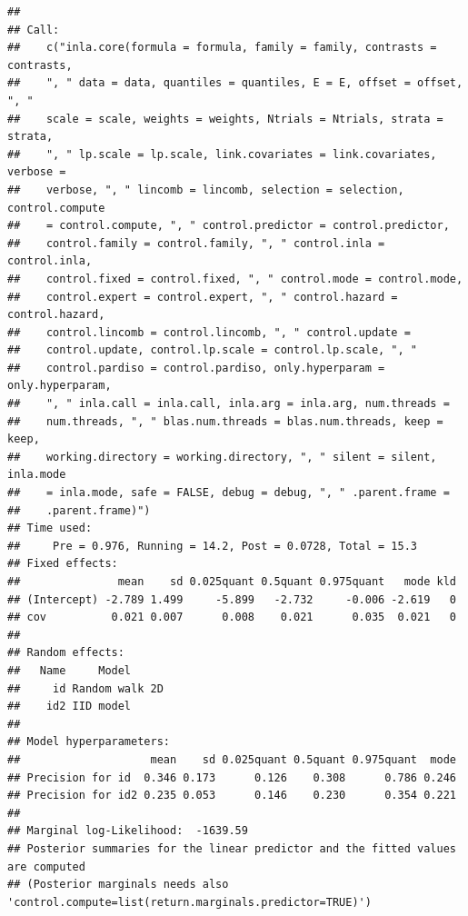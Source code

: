 \documentclass[
]{article}
\begin{document}
\begin{verbatim}
## 
## Call:
##    c("inla.core(formula = formula, family = family, contrasts = contrasts, 
##    ", " data = data, quantiles = quantiles, E = E, offset = offset, ", " 
##    scale = scale, weights = weights, Ntrials = Ntrials, strata = strata, 
##    ", " lp.scale = lp.scale, link.covariates = link.covariates, verbose = 
##    verbose, ", " lincomb = lincomb, selection = selection, control.compute 
##    = control.compute, ", " control.predictor = control.predictor, 
##    control.family = control.family, ", " control.inla = control.inla, 
##    control.fixed = control.fixed, ", " control.mode = control.mode, 
##    control.expert = control.expert, ", " control.hazard = control.hazard, 
##    control.lincomb = control.lincomb, ", " control.update = 
##    control.update, control.lp.scale = control.lp.scale, ", " 
##    control.pardiso = control.pardiso, only.hyperparam = only.hyperparam, 
##    ", " inla.call = inla.call, inla.arg = inla.arg, num.threads = 
##    num.threads, ", " blas.num.threads = blas.num.threads, keep = keep, 
##    working.directory = working.directory, ", " silent = silent, inla.mode 
##    = inla.mode, safe = FALSE, debug = debug, ", " .parent.frame = 
##    .parent.frame)") 
## Time used:
##     Pre = 0.976, Running = 14.2, Post = 0.0728, Total = 15.3 
## Fixed effects:
##               mean    sd 0.025quant 0.5quant 0.975quant   mode kld
## (Intercept) -2.789 1.499     -5.899   -2.732     -0.006 -2.619   0
## cov          0.021 0.007      0.008    0.021      0.035  0.021   0
## 
## Random effects:
##   Name     Model
##     id Random walk 2D
##    id2 IID model
## 
## Model hyperparameters:
##                    mean    sd 0.025quant 0.5quant 0.975quant  mode
## Precision for id  0.346 0.173      0.126    0.308      0.786 0.246
## Precision for id2 0.235 0.053      0.146    0.230      0.354 0.221
## 
## Marginal log-Likelihood:  -1639.59 
## Posterior summaries for the linear predictor and the fitted values are computed
## (Posterior marginals needs also 'control.compute=list(return.marginals.predictor=TRUE)')
\end{verbatim}
\end{document}
